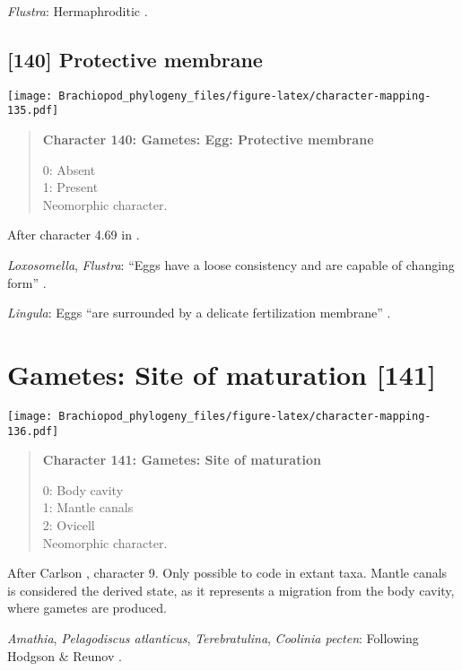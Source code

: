 \documentclass[openany]{book}
\theoremstyle{definition}
\theoremstyle{definition}
\theoremstyle{definition}
\theoremstyle{remark}
\begin{document}
\hypertarget{Flustra-coding-139}{}
\emph{Flustra}: Hermaphroditic \citep{Reed1988}.

\subsection*{{[}140{]} Protective membrane}\label{protective-membrane}

\texttt{[image: Brachiopod\_phylogeny\_files/figure-latex/character-mapping-135.pdf]}

\begin{quote}
\textbf{Character 140: Gametes: Egg: Protective membrane}

0: Absent\\
1: Present\\
Neomorphic character.
\end{quote}

After character 4.69 in \citet{SPS1996}.

\hypertarget{Flustra-coding-140}{}
\emph{Loxosomella}, \emph{Flustra}: ``Eggs have a loose consistency and
are capable of changing form'' \citep{Franzen1977}.

\hypertarget{Lingula-coding-140}{}
\emph{Lingula}: Eggs ``are surrounded by a delicate fertilization
membrane'' \citep{Pennerstorfer2012}.

\section{Gametes: Site of maturation
{[}141{]}}\label{gametes-site-of-maturation-141}

\texttt{[image: Brachiopod\_phylogeny\_files/figure-latex/character-mapping-136.pdf]}

\begin{quote}
\textbf{Character 141: Gametes: Site of maturation}

0: Body cavity\\
1: Mantle canals\\
2: Ovicell\\
Neomorphic character.
\end{quote}

After Carlson \citeyearpar{Carlson1995Phylogeneticrelationships},
character 9. Only possible to code in extant taxa. Mantle canals is
considered the derived state, as it represents a migration from the body
cavity, where gametes are produced.

\hypertarget{Amathia-coding-141}{}
\emph{Amathia}, \emph{Pelagodiscus atlanticus}, \emph{Terebratulina},
\emph{Coolinia pecten}: Following Hodgson \& Reunov
\citeyearpar{Hodgson1994Ultrastructureof}.
\end{document}
